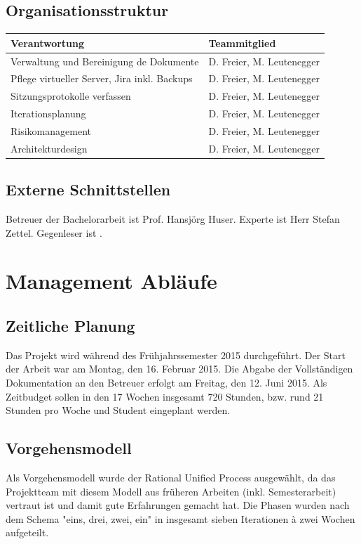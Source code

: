 \subsection*{Organisationsstruktur}
\begin{tabularx}{\textwidth}{Xl}
	\textbf{Verantwortung}	& \textbf{Teammitglied} \\
	\hline
	Verwaltung und Bereinigung de Dokumente		& D. Freier, M. Leutenegger \\ \hline
	Pflege virtueller Server, Jira inkl. Backups	& D. Freier, M. Leutenegger \\ \hline
	Sitzungsprotokolle verfassen					& D. Freier, M. Leutenegger \\ \hline
	Iterationsplanung							& D. Freier, M. Leutenegger \\ \hline
	Risikomanagement								& D. Freier, M. Leutenegger \\ \hline
	Architekturdesign							& D. Freier, M. Leutenegger \\ \hline
\end{tabularx}

\subsection*{Externe Schnittstellen}
Betreuer der Bachelorarbeit ist Prof. Hansjörg Huser. Experte ist Herr Stefan Zettel. Gegenleser ist \tbd .
\pagebreak

\section*{Management Abläufe}
\subsection*{Zeitliche Planung}
Das Projekt wird während des Frühjahrssemester 2015 durchgeführt. Der Start der Arbeit war am Montag, den 16. Februar 2015. Die Abgabe der Vollständigen Dokumentation an den Betreuer erfolgt am Freitag, den 12. Juni 2015. Als Zeitbudget sollen in den 17 Wochen insgesamt 720 Stunden, bzw. rund 21 Stunden pro Woche und Student eingeplant werden.

\subsection*{Vorgehensmodell}
Als Vorgehensmodell wurde der Rational Unified Process ausgewählt, da das Projektteam mit diesem Modell aus früheren Arbeiten (inkl. Semesterarbeit) vertraut ist und damit gute Erfahrungen gemacht hat. Die Phasen wurden nach dem Schema "eins, drei, zwei, ein" in insgesamt sieben Iterationen à zwei Wochen aufgeteilt. \tbd

